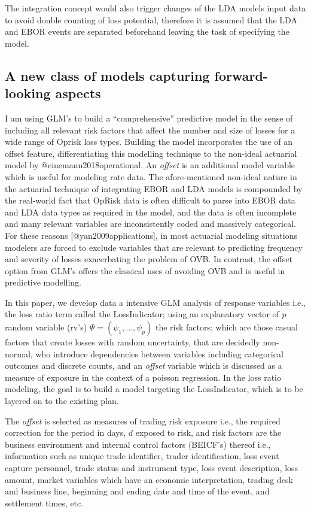 \documentclass[]{article}
\begin{document}
The integration concept would also trigger changes of the LDA models
input data to avoid double counting of loss potential, therefore it is
assumed that the LDA and EBOR events are separated beforehand leaving
the task of specifying the model.

\subsection{A new class of models capturing forward-looking aspects}
\label{sec:A new class of models capturing forward-looking aspects}

I am using GLM's to build a ``comprehensive'' predictive model in the
sense of including all relevant risk factors that affect the number and
size of losses for a wide range of Oprisk loss types. Building the model
incorporates the use of an offset feature, differentiating this
modelling technique to the non-ideal actuarial model by
@einemann2018operational. An \emph{offset} is an additional model
variable which is useful for modeling rate data. The afore-mentioned
non-ideal nature in the actuarial technique of integrating EBOR and LDA
models is compounded by the real-world fact that OpRisk data is often
difficult to parse into EBOR data and LDA data types as required in the
model, and the data is often incomplete and many relevant variables are
inconsistently coded and massively categorical. For these reasons
{[}@yan2009applications{]}, in most actuarial modeling situations
modelers are forced to exclude variables that are relevant to predicting
frequency and severity of losses exacerbating the problem of OVB. In
contrast, the offset option from GLM's offers the classical uses of
avoiding OVB and is useful in predictive modelling.\medskip

In this paper, we develop data a intensive GLM analysis of response
variables i.e., the loss ratio term called the LossIndicator; using an
explanatory vector of \(p\) random variable (rv's)
\(\Psi = (\psi_1,\ldots,\psi_p)\) the risk factors; which are those
casual factors that create losses with random uncertainty, that are
decidedly non-normal, who introduce dependencies between variables
including categorical outcomes and discrete counts, and an \emph{offset}
variable which is discussed as a measure of exposure in the context of a
poisson regression. In the loss ratio modeling, the goal is to build a
model targeting the LossIndicator, which is to be layered on to the
existing plan.\medskip

The \emph{offset} is selected as measures of trading risk exposure i.e.,
the required correction for the period in days, \(d\) exposed to risk,
and risk factors are the business environment and internal control
factors (BEICF's) thereof i.e., information such as unique trade
identifier, trader identification, loss event capture personnel, trade
status and instrument type, loss event description, loss amount, market
variables which have an economic interpretation, trading desk and
business line, beginning and ending date and time of the event, and
settlement times, etc.
\end{document}
